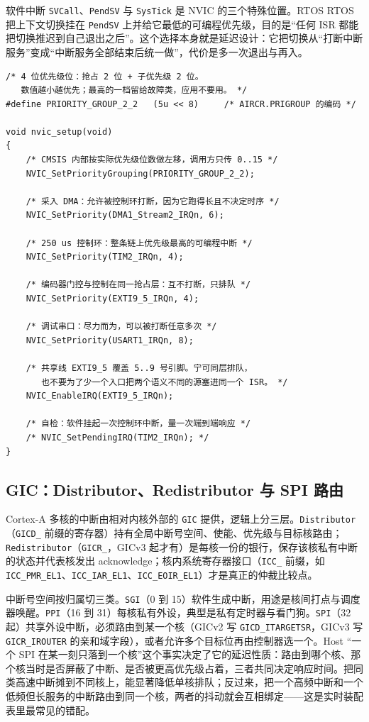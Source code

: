 \documentclass[12pt,a4paper,fontset=fandol]{ctexbook}
\newcommand{\Tp}[1]{\texttt{#1}}
\newcommand{\Lang}[1]{\textsf{#1}}
\newcommand{\DomRtos}{\Lang{RTOS}}
\newcommand{\DomHost}{\Lang{Host}}
\begin{document}
软件中断 \Tp{SVCall}、\Tp{PendSV} 与 \Tp{SysTick} 是 NVIC 的三个特殊位置。\DomRtos{} RTOS 把上下文切换挂在 \Tp{PendSV} 上并给它最低的可编程优先级，目的是``任何 ISR 都能把切换推迟到自己退出之后''。这个选择本身就是延迟设计：它把切换从``打断中断服务''变成``中断服务全部结束后统一做''，代价是多一次退出与再入。

\begin{lstlisting}[style=cstyle,caption={C：NVIC 优先级与分组配置（4 位优先级、2 加 2 切分的例子）},label={lst:ch03-nvic}]
/* 4 位优先级位：抢占 2 位 + 子优先级 2 位。
   数值越小越优先；最高的一档留给故障类，应用不要用。 */
#define PRIORITY_GROUP_2_2   (5u << 8)     /* AIRCR.PRIGROUP 的编码 */

void nvic_setup(void)
{
    /* CMSIS 内部按实际优先级位数做左移，调用方只传 0..15 */
    NVIC_SetPriorityGrouping(PRIORITY_GROUP_2_2);

    /* 采入 DMA：允许被控制环打断，因为它跑得长且不决定时序 */
    NVIC_SetPriority(DMA1_Stream2_IRQn, 6);

    /* 250 us 控制环：整条链上优先级最高的可编程中断 */
    NVIC_SetPriority(TIM2_IRQn, 4);

    /* 编码器门控与控制在同一抢占层：互不打断，只排队 */
    NVIC_SetPriority(EXTI9_5_IRQn, 4);

    /* 调试串口：尽力而为，可以被打断任意多次 */
    NVIC_SetPriority(USART1_IRQn, 8);

    /* 共享线 EXTI9_5 覆盖 5..9 号引脚。宁可同层排队，
       也不要为了少一个入口把两个语义不同的源塞进同一个 ISR。 */
    NVIC_EnableIRQ(EXTI9_5_IRQn);

    /* 自检：软件挂起一次控制环中断，量一次端到端响应 */
    /* NVIC_SetPendingIRQ(TIM2_IRQn); */
}
\end{lstlisting}

\subsection{GIC：Distributor、Redistributor 与 SPI 路由}

Cortex-A 多核的中断由相对内核外部的 \Tp{GIC} 提供，逻辑上分三层。\Tp{Distributor}（\Tp{GICD\_} 前缀的寄存器）持有全局中断号空间、使能、优先级与目标核路由；\Tp{Redistributor}（\Tp{GICR\_}，GICv3 起才有）是每核一份的银行，保存该核私有中断的状态并代表核发出 acknowledge；核内系统寄存器接口（\Tp{ICC\_} 前缀，如 \Tp{ICC\_PMR\_EL1}、\Tp{ICC\_IAR\_EL1}、\Tp{ICC\_EOIR\_EL1}）才是真正的仲裁比较点。

中断号空间按归属切三类。\Tp{SGI}（0 到 15）软件生成中断，用途是核间打点与调度器唤醒。\Tp{PPI}（16 到 31）每核私有外设，典型是私有定时器与看门狗。\Tp{SPI}（32 起）共享外设中断，必须路由到某一个核（GICv2 写 \Tp{GICD\_ITARGETSR}，GICv3 写 \Tp{GICR\_IROUTER} 的亲和域字段），或者允许多个目标位再由控制器选一个。\DomHost{} ``一个 SPI 在某一刻只落到一个核''这个事实决定了它的延迟性质：路由到哪个核、那个核当时是否屏蔽了中断、是否被更高优先级占着，三者共同决定响应时间。把同类高速中断摊到不同核上，能显著降低单核排队；反过来，把一个高频中断和一个低频但长服务的中断路由到同一个核，两者的抖动就会互相绑定——这是实时装配表里最常见的错配。
\end{document}
